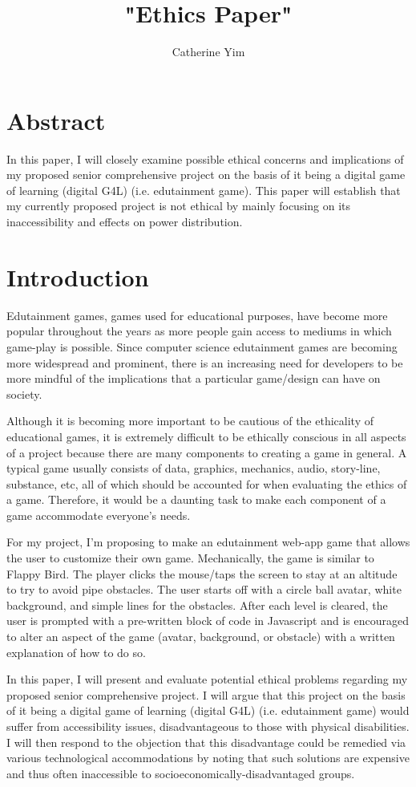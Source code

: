 \documentclass[10pt,twocolumn]{article}
\title{ "Ethics Paper" }
\author{Catherine Yim}
\affiliation{Occidental College}
\begin{document}
\maketitle
\section{Abstract}
    In this paper, I will closely examine possible ethical concerns and implications of my proposed senior comprehensive project on the basis of it being a digital game of learning (digital G4L) (i.e. edutainment game). This paper will establish that my currently proposed project is not ethical by mainly focusing on its inaccessibility and effects on power distribution.


\section{Introduction}
    Edutainment games, games used for educational purposes, have become more popular throughout the years as more people gain access to mediums in which game-play is possible. Since computer science edutainment games are becoming more widespread and prominent, there is an increasing need for developers to be more mindful of the implications that a particular game/design can have on society.
    
    Although it is becoming more important to be cautious of the ethicality of educational games, it is extremely difficult to be ethically conscious in all aspects of a project because there are many components to creating a game in general. A typical game usually consists of data, graphics, mechanics, audio, story-line, substance, etc, all of which should be accounted for when evaluating the ethics of a game. Therefore, it would be a daunting task to make each component of a game accommodate everyone's needs. 
    
    For my project, I’m proposing to make an edutainment web-app game that allows the user to customize their own game. Mechanically, the game is similar to Flappy Bird. The player clicks the mouse/taps the screen to stay at an altitude to try to avoid pipe obstacles. The user starts off with a circle ball avatar, white background, and simple lines for the obstacles. After each level is cleared, the user is prompted with a pre-written block of code in Javascript and is encouraged to alter an aspect of the game (avatar, background, or obstacle) with a written explanation of how to do so. 
    
    In this paper, I will present and evaluate potential ethical problems regarding my proposed senior comprehensive project. I will argue that this project on the basis of it being a digital game of learning (digital G4L) (i.e. edutainment game) would suffer from accessibility issues, disadvantageous to those with physical disabilities. I will then respond to the objection that this disadvantage could be remedied via various technological accommodations by noting that such solutions are expensive and thus often inaccessible to socioeconomically-disadvantaged groups.
\end{document}
